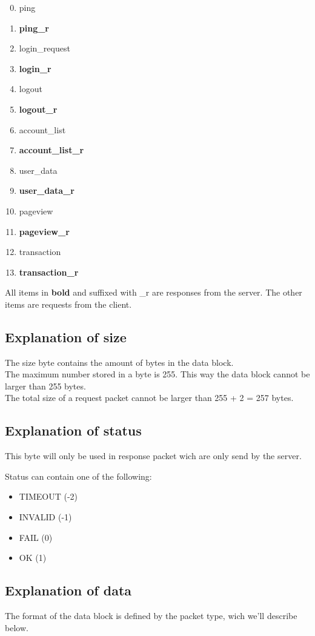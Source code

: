 \documentclass[12pt]{article}
\begin{document}
\begin{enumerate}
	\setcounter{enumi}{-1}
	\item ping
	\item \textbf{ping\_r}
	\item login\_request
	\item \textbf{login\_r}
	\item logout
	\item \textbf{logout\_r}
	\item account\_list
	\item \textbf{account\_list\_r}
	\item user\_data
	\item \textbf{user\_data\_r}
	\item pageview
	\item \textbf{pageview\_r}
	\item transaction
	\item \textbf{transaction\_r}
\end{enumerate}

All items in \textbf{bold} and suffixed with \_r are responses from the server.
The other items are requests from the client.

\subsection{Explanation of size} \label{hfst:size}
The size byte contains the amount of bytes in the data block.\\
The maximum number stored in a byte is 255. This way the data block
cannot be larger than 255 bytes.\\ The total size of a request
packet cannot be larger than 255 + 2 = 257 bytes.

\subsection{Explanation of status} \label{hfst:status}
This byte will only be used in response packet wich are only send by the server.

Status can contain one of the following:
\begin{itemize}
	\item TIMEOUT (-2)
	\item INVALID (-1)
	\item FAIL (0)
	\item OK (1)
\end{itemize}

\subsection{Explanation of data} \label{hfst:data}
The format of the data block is defined by the packet type, wich we'll describe below.
\end{document}
